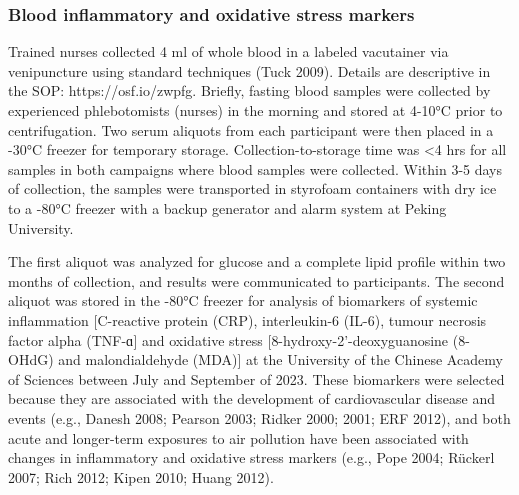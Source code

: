 \documentclass[
  letterpaper,
  DIV=11,
  numbers=noendperiod]{scrartcl}
\begin{document}
\hypertarget{blood-inflammatory-and-oxidative-stress-markers}{%
\subsubsection{Blood inflammatory and oxidative stress
markers}\label{blood-inflammatory-and-oxidative-stress-markers}}

Trained nurses collected 4 ml of whole blood in a labeled vacutainer via
venipuncture using standard techniques (Tuck 2009). Details are
descriptive in the SOP: https://osf.io/zwpfg. Briefly, fasting blood
samples were collected by experienced phlebotomists (nurses) in the
morning and stored at 4-10°C prior to centrifugation. Two serum aliquots
from each participant were then placed in a -30°C freezer for temporary
storage. Collection-to-storage time was \textless4 hrs for all samples
in both campaigns where blood samples were collected. Within 3-5 days of
collection, the samples were transported in styrofoam containers with
dry ice to a -80°C freezer with a backup generator and alarm system at
Peking University.

The first aliquot was analyzed for glucose and a complete lipid profile
within two months of collection, and results were communicated to
participants. The second aliquot was stored in the -80°C freezer for
analysis of biomarkers of systemic inflammation {[}C-reactive protein
(CRP), interleukin-6 (IL-6), tumour necrosis factor alpha (TNF-ɑ{]} and
oxidative stress {[}8-hydroxy-2'-deoxyguanosine (8-OHdG) and
malondialdehyde (MDA){]} at the University of the Chinese Academy of
Sciences between July and September of 2023. These biomarkers were
selected because they are associated with the development of
cardiovascular disease and events (e.g., Danesh 2008; Pearson 2003;
Ridker 2000; 2001; ERF 2012), and both acute and longer-term exposures
to air pollution have been associated with changes in inflammatory and
oxidative stress markers (e.g., Pope 2004; Rückerl 2007; Rich 2012;
Kipen 2010; Huang 2012).
\end{document}
